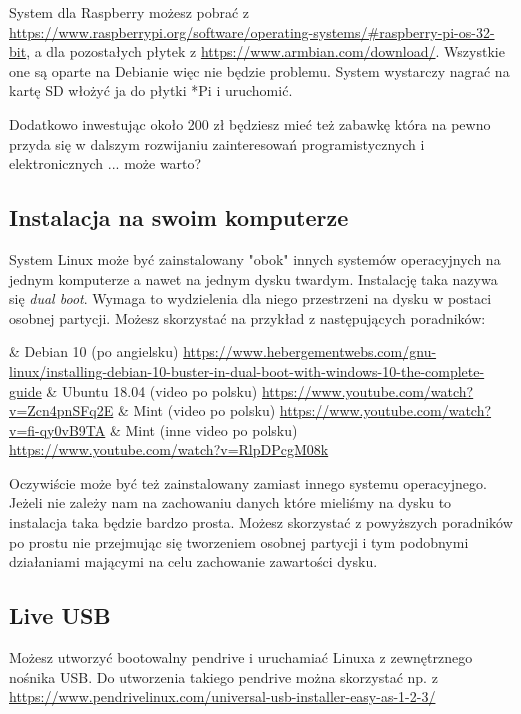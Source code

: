 \documentclass{pdfBooklets}
\begin{document}
\vspace{7pt}
System dla Raspberry możesz pobrać z \url{https://www.raspberrypi.org/software/operating-systems/#raspberry-pi-os-32-bit}, a dla pozostałych płytek z \url{https://www.armbian.com/download/}.
Wszystkie one są oparte na Debianie więc nie będzie problemu. System wystarczy nagrać na kartę SD włożyć ja do płytki *Pi i uruchomić.

\vspace{7pt}
Dodatkowo inwestując około 200 zł będziesz mieć też zabawkę która na pewno przyda się w dalszym rozwijaniu zainteresowań programistycznych i elektronicznych ... może warto?

\subsection{Instalacja na swoim komputerze}

System Linux może być zainstalowany "obok" innych systemów operacyjnych na jednym komputerze a nawet na jednym dysku twardym.
Instalację taka nazywa się \textit{dual boot}. Wymaga to wydzielenia dla niego przestrzeni na dysku w postaci osobnej partycji.
Możesz skorzystać na przykład z następujących poradników:
\vspace{3pt}\begin{easylist}[itemize]
	& Debian 10 (po angielsku) \url{https://www.hebergementwebs.com/gnu-linux/installing-debian-10-buster-in-dual-boot-with-windows-10-the-complete-guide}
	& Ubuntu 18.04 (video po polsku) \url{https://www.youtube.com/watch?v=Zcn4pnSFq2E}
	& Mint (video po polsku) \url{https://www.youtube.com/watch?v=fi-qy0vB9TA}
	& Mint (inne video po polsku) \url{https://www.youtube.com/watch?v=RlpDPcgM08k}
\end{easylist}

\vspace{7pt}
Oczywiście może być też zainstalowany zamiast innego systemu operacyjnego.
Jeżeli nie zależy nam na zachowaniu danych które mieliśmy na dysku to instalacja taka będzie bardzo prosta.
Możesz skorzystać z powyższych poradników po prostu nie przejmując się tworzeniem osobnej partycji i tym podobnymi działaniami mającymi na celu zachowanie zawartości dysku.

\subsection{Live USB}

Możesz utworzyć bootowalny pendrive i uruchamiać Linuxa z zewnętrznego nośnika USB.
Do utworzenia takiego pendrive można skorzystać np. z \url{https://www.pendrivelinux.com/universal-usb-installer-easy-as-1-2-3/}
\end{document}
